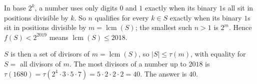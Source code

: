 In base $2^k$, a number uses only digits $0$ and $1$ exactly when its binary $1$s all sit in positions divisible by $k$. So $n$ qualifies for every $k\in S$ exactly when its binary $1$s sit in positions divisible by $m=\operatorname{lcm}(S)$; the smallest such $n>1$ is $2^m$. Hence $f(S)<2^{2019}$ means $\operatorname{lcm}(S)\le2018$.

$S$ is then a set of divisors of $m=\operatorname{lcm}(S)$, so $|S|\le\tau(m)$, with equality for $S=$ all divisors of $m$. The most divisors of a number up to $2018$ is $\tau(1680)=\tau(2^4\cdot3\cdot5\cdot7)=5\cdot2\cdot2\cdot2=40$. The answer is $\boxed{40}$.
